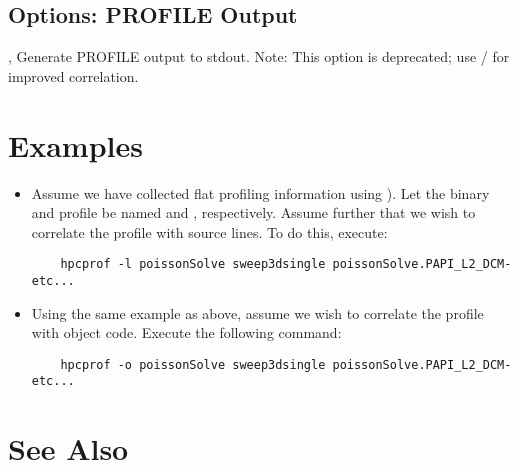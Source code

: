 \documentclass[english]{article}
\begin{document}
\subsection{Options: PROFILE Output}
\begin{Description}
  \item[\Opt{-p}, \Opt{--profile}] Generate PROFILE output to stdout. Note: This option is deprecated; use / for improved correlation.
\end{Description}



\section{Examples}

\begin{itemize}

\item Assume we have collected flat profiling information using  ).
Let the binary and profile be named  and , respectively.
Assume further that we wish to correlate the profile with source lines.
To do this, execute:
\begin{verbatim}
    hpcprof -l poissonSolve sweep3dsingle poissonSolve.PAPI_L2_DCM-etc...
\end{verbatim}

\item Using the same example as above, assume we wish to correlate the profile with object code.  Execute the following command:
\begin{verbatim}
    hpcprof -o poissonSolve sweep3dsingle poissonSolve.PAPI_L2_DCM-etc...
\end{verbatim}

\end{itemize}


\section{See Also}
\end{document}
